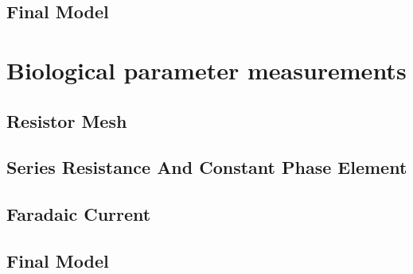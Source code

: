     \subsection{Final Model}

\section{Biological parameter measurements}
    \label{sect:sheep_measurements}
    \subsection{Resistor Mesh}
    \subsection{Series Resistance And Constant Phase Element}
    \subsection{Faradaic Current}
    \subsection{Final Model}
